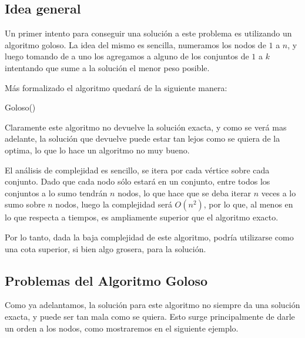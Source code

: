 \subsection{Idea general}

Un primer intento para conseguir una solución a este problema es utilizando un algoritmo goloso. La idea del mismo es sencilla, numeramos los nodos de $1$ a $n$, y luego tomando de a uno los agregamos a alguno de los conjuntos de $1$ a $k$ intentando que sume a la solución el menor peso posible.

Más formalizado el algoritmo quedará de la siguiente manera:


\begin{algorithm}
  \begin{algorithmic}[1]\parskip=1mm
 \caption{ Goloso()}
  \end{algorithmic}
  \end{algorithm}


Claramente este algoritmo no devuelve la solución exacta, y como se verá mas adelante, la solución que devuelve puede estar tan lejos como se quiera de la optima, lo que lo hace un algoritmo no muy bueno.

El análisis de complejidad es sencillo, se itera por cada vértice sobre cada conjunto. Dado que cada nodo sólo estará en un conjunto, entre todos los conjuntos a lo sumo tendrán $n$ nodos, lo que hace que se deba iterar $n$ veces a lo sumo sobre $n$ nodos, luego la complejidad será $O(n^2)$, por lo que, al menos en lo que respecta a tiempos, es ampliamente superior que el algoritmo exacto.

Por lo tanto, dada la baja complejidad de este algoritmo, podría utilizarse como una cota superior, si bien algo grosera, para la solución.

\subsection{Problemas del Algoritmo Goloso}

Como ya adelantamos, la solución para este algoritmo no siempre da una solución exacta, y puede ser tan mala como se quiera. Esto surge principalmente de darle un orden a los nodos, como mostraremos en el siguiente ejemplo.

